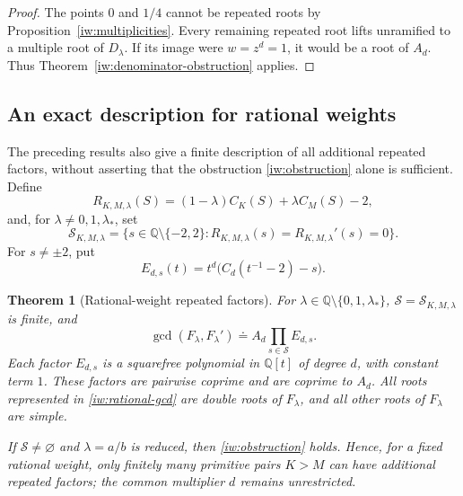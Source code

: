 \documentclass[11pt,a4paper]{article}
\newtheorem{theorem}{Theorem}[section]
\theoremstyle{definition}
\theoremstyle{remark}
\begin{document}
\begin{proof}
The points \(0\) and \(1/4\) cannot be repeated roots by
Proposition~\ref{iw:multiplicities}. Every remaining repeated
root lifts unramified to a multiple root of \(D_\lambda\).
If its image were \(w=z^d=1\), it would be a root of \(A_d\).
Thus Theorem~\ref{iw:denominator-obstruction} applies.
\end{proof}

\subsection{An exact description for rational weights}

The preceding results also give a finite description of all
additional repeated factors, without asserting that the obstruction
\eqref{iw:obstruction} alone is sufficient.
Define
\begin{equation}\label{iw:R}
 R_{K,M,\lambda}(S)
 =(1-\lambda)C_K(S)+\lambda C_M(S)-2,
\end{equation}
and, for \(\lambda\ne0,1,\lambda_*\), set
\begin{equation}\label{iw:S}
 \mathcal S_{K,M,\lambda}
 =\{s\in\mathbb Q\setminus\{-2,2\}:
         R_{K,M,\lambda}(s)=R_{K,M,\lambda}'(s)=0\}.
\end{equation}
For \(s\ne\pm2\), put
\begin{equation}\label{iw:E}
 E_{d,s}(t)=t^d\bigl(C_d(t^{-1}-2)-s\bigr).
\end{equation}

\begin{theorem}[Rational-weight repeated factors]\label{iw:rational}
For \(\lambda\in\mathbb Q\setminus\{0,1,\lambda_*\}\),
\(\mathcal S=\mathcal S_{K,M,\lambda}\) is finite, and
\begin{equation}\label{iw:rational-gcd}
 \gcd(F_\lambda,F_\lambda')
 \doteq A_d\prod_{s\in\mathcal S}E_{d,s}.
\end{equation}
Each factor \(E_{d,s}\) is a squarefree polynomial in
\(\mathbb Q[t]\) of degree \(d\), with constant term \(1\).
These factors are pairwise coprime and are coprime to \(A_d\).
All roots represented in \eqref{iw:rational-gcd} are double
roots of \(F_\lambda\), and all other roots of \(F_\lambda\)
are simple.

If \(\mathcal S\ne\varnothing\) and \(\lambda=a/b\) is reduced,
then \eqref{iw:obstruction} holds. Hence, for a fixed rational
weight, only finitely many primitive pairs \(K>M\) can have
additional repeated factors; the common multiplier \(d\) remains
unrestricted.
\end{theorem}
\end{document}
